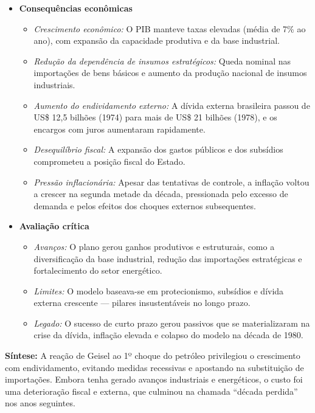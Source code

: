 \documentclass[a4paper,12pt]{article}[abntex2]
\begin{document}
\begin{itemize}
    \item \textbf{Consequências econômicas}
    \begin{itemize}
        \item \textit{Crescimento econômico:} O PIB manteve taxas elevadas (média de 7\% ao ano), com expansão da capacidade produtiva e da base industrial.
        \item \textit{Redução da dependência de insumos estratégicos:} Queda nominal nas importações de bens básicos e aumento da produção nacional de insumos industriais.
        \item \textit{Aumento do endividamento externo:} A dívida externa brasileira passou de US\$ 12,5 bilhões (1974) para mais de US\$ 21 bilhões (1978), e os encargos com juros aumentaram rapidamente.
        \item \textit{Desequilíbrio fiscal:} A expansão dos gastos públicos e dos subsídios comprometeu a posição fiscal do Estado.
        \item \textit{Pressão inflacionária:} Apesar das tentativas de controle, a inflação voltou a crescer na segunda metade da década, pressionada pelo excesso de demanda e pelos efeitos dos choques externos subsequentes.
    \end{itemize}

    \item \textbf{Avaliação crítica}
    \begin{itemize}
        \item \textit{Avanços:} O plano gerou ganhos produtivos e estruturais, como a diversificação da base industrial, redução das importações estratégicas e fortalecimento do setor energético.
        \item \textit{Limites:} O modelo baseava-se em protecionismo, subsídios e dívida externa crescente — pilares insustentáveis no longo prazo.
        \item \textit{Legado:} O sucesso de curto prazo gerou passivos que se materializaram na crise da dívida, inflação elevada e colapso do modelo na década de 1980.
    \end{itemize}
\end{itemize}

\textbf{Síntese:} A reação de Geisel ao 1º choque do petróleo privilegiou o crescimento com endividamento, evitando medidas recessivas e apostando na substituição de importações. Embora tenha gerado avanços industriais e energéticos, o custo foi uma deterioração fiscal e externa, que culminou na chamada “década perdida” nos anos seguintes.
\end{document}
